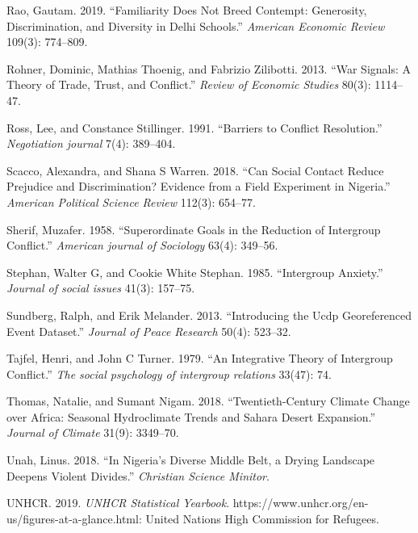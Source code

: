 \documentclass[11pt]{article}
\begin{document}
\leavevmode\hypertarget{ref-rao2019familiarity}{}%
Rao, Gautam. 2019. ``Familiarity Does Not Breed Contempt: Generosity,
Discrimination, and Diversity in Delhi Schools.'' \emph{American
Economic Review} 109(3): 774--809.

\leavevmode\hypertarget{ref-rohner2013war}{}%
Rohner, Dominic, Mathias Thoenig, and Fabrizio Zilibotti. 2013. ``War
Signals: A Theory of Trade, Trust, and Conflict.'' \emph{Review of
Economic Studies} 80(3): 1114--47.

\leavevmode\hypertarget{ref-ross1991barriers}{}%
Ross, Lee, and Constance Stillinger. 1991. ``Barriers to Conflict
Resolution.'' \emph{Negotiation journal} 7(4): 389--404.

\leavevmode\hypertarget{ref-scacco2018nigeria}{}%
Scacco, Alexandra, and Shana S Warren. 2018. ``Can Social Contact Reduce
Prejudice and Discrimination? Evidence from a Field Experiment in
Nigeria.'' \emph{American Political Science Review} 112(3): 654--77.

\leavevmode\hypertarget{ref-sherif1958superordinate}{}%
Sherif, Muzafer. 1958. ``Superordinate Goals in the Reduction of
Intergroup Conflict.'' \emph{American journal of Sociology} 63(4):
349--56.

\leavevmode\hypertarget{ref-stephan1985intergroup}{}%
Stephan, Walter G, and Cookie White Stephan. 1985. ``Intergroup
Anxiety.'' \emph{Journal of social issues} 41(3): 157--75.

\leavevmode\hypertarget{ref-ucdp}{}%
Sundberg, Ralph, and Erik Melander. 2013. ``Introducing the Ucdp
Georeferenced Event Dataset.'' \emph{Journal of Peace Research} 50(4):
523--32.

\leavevmode\hypertarget{ref-tajfel1979integrative}{}%
Tajfel, Henri, and John C Turner. 1979. ``An Integrative Theory of
Intergroup Conflict.'' \emph{The social psychology of intergroup
relations} 33(47): 74.

\leavevmode\hypertarget{ref-thomas2018sahara}{}%
Thomas, Natalie, and Sumant Nigam. 2018. ``Twentieth-Century Climate
Change over Africa: Seasonal Hydroclimate Trends and Sahara Desert
Expansion.'' \emph{Journal of Climate} 31(9): 3349--70.

\leavevmode\hypertarget{ref-unah2018nigeria}{}%
Unah, Linus. 2018. ``In Nigeria's Diverse Middle Belt, a Drying
Landscape Deepens Violent Divides.'' \emph{Christian Science Minitor}.

\leavevmode\hypertarget{ref-unhcr2019}{}%
UNHCR. 2019. \emph{UNHCR Statistical Yearbook}.
https://www.unhcr.org/en-us/figures-at-a-glance.html: United Nations
High Commission for Refugees.
\end{document}
